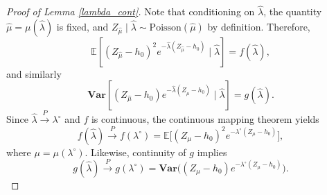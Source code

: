 \documentclass[12pt]{article}
\numberwithin{equation}{section}
\begin{document}
\begin{proof}[Proof of Lemma \ref{lambda_cont}]
Note that conditioning on $\hat\lambda$, the quantity $\hat\mu=\mu(\hat\lambda)$ is fixed, and
$Z_{\hat\mu}\mid \hat\lambda \sim \mathrm{Poisson}(\hat\mu)$ by definition. Therefore,
\[
\mathbb{E}\!\left[(Z_{\hat{\mu}}-h_0)^2e^{-\hat{\lambda}(Z_{\hat{\mu}}-h_0)}\mid \hat{\lambda}\right]
= f(\hat\lambda),
\]
and similarly
\[
\mathbf{Var}\!\left[(Z_{\hat{\mu}}-h_0)e^{-\hat{\lambda}(Z_{\hat{\mu}}-h_0)}\mid \hat{\lambda}\right]
= g(\hat\lambda).
\]
Since $\hat\lambda\xrightarrow{P}\lambda^{\circ}$ and $f$ is continuous, the continuous mapping theorem yields
\[
f(\hat\lambda)\xrightarrow{P} f(\lambda^{\circ})
=\mathbb{E}\Big[(Z_{\mu}-h_0)^2e^{-\lambda^{\circ}(Z_{\mu}-h_0)}\Big],
\]
where $\mu=\mu(\lambda^{\circ})$. Likewise, continuity of $g$ implies
\[
g(\hat\lambda)\xrightarrow{P} g(\lambda^{\circ})
=\mathbf{Var}\Big((Z_{\mu}-h_0)e^{-\lambda^{\circ}(Z_{\mu}-h_0)}\Big).
\]

\end{proof}
\end{document}

